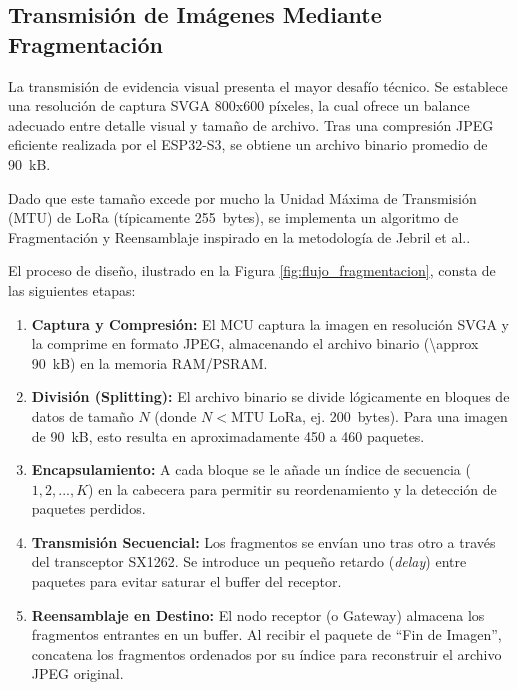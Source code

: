 \subsection{Transmisión de Imágenes Mediante Fragmentación}
\label{subsec:transmision_fragmentada}

La transmisión de evidencia visual presenta el mayor desafío técnico. Se establece una resolución de captura SVGA 800x600 píxeles, la cual ofrece un balance adecuado entre detalle visual y tamaño de archivo. Tras una compresión JPEG eficiente realizada por el ESP32-S3, se obtiene un archivo binario promedio de \SI{90}{kB}.

Dado que este tamaño excede por mucho la Unidad Máxima de Transmisión (MTU) de LoRa (típicamente \SI{255}{bytes}), se implementa un algoritmo de Fragmentación y Reensamblaje inspirado en la metodología de Jebril et al..\cite{jebril2018overcoming}

El proceso de diseño, ilustrado en la Figura \ref{fig:flujo_fragmentacion}, consta de las siguientes etapas:

\begin{enumerate}
  \item \textbf{Captura y Compresión:} El MCU captura la imagen en resolución SVGA y la comprime en formato JPEG, almacenando el archivo binario (\SI{\approx 90}{kB}) en la memoria RAM/PSRAM.
  \item \textbf{División (Splitting):} El archivo binario se divide lógicamente en bloques de datos de tamaño $N$ (donde $N < \text{MTU LoRa}$, ej. \SI{200}{bytes}). Para una imagen de \SI{90}{kB}, esto resulta en aproximadamente 450 a 460 paquetes.
  \item \textbf{Encapsulamiento:} A cada bloque se le añade un índice de secuencia ($1, 2, ..., K$) en la cabecera para permitir su reordenamiento y la detección de paquetes perdidos.
  \item \textbf{Transmisión Secuencial:} Los fragmentos se envían uno tras otro a través del transceptor SX1262. Se introduce un pequeño retardo (\textit{delay}) entre paquetes para evitar saturar el buffer del receptor.
  \item \textbf{Reensamblaje en Destino:} El nodo receptor (o Gateway) almacena los fragmentos entrantes en un buffer. Al recibir el paquete de ``Fin de Imagen'', concatena los fragmentos ordenados por su índice para reconstruir el archivo JPEG original.
\end{enumerate}

